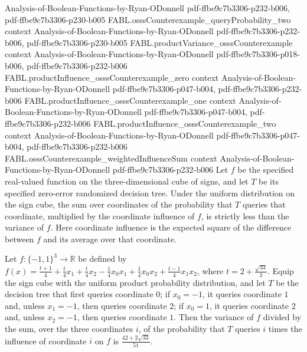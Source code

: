 \begin{theorem}
  {Analysis-of-Boolean-Functions-by-Ryan-ODonnell}
  {pdf-ffbe9c7b3306-p232-b006,
    pdf-ffbe9c7b3306-p230-b005}
\proofstep
  {FABL.osssCounterexample_queryProbability_two}
  {context}
  {Analysis-of-Boolean-Functions-by-Ryan-ODonnell}
  {pdf-ffbe9c7b3306-p232-b006,
    pdf-ffbe9c7b3306-p230-b005}
\proofstep
  {FABL.productVariance_osssCounterexample}
  {context}
  {Analysis-of-Boolean-Functions-by-Ryan-ODonnell}
  {pdf-ffbe9c7b3306-p018-b006,
    pdf-ffbe9c7b3306-p232-b006}
\proofstep
  {FABL.productInfluence_osssCounterexample_zero}
  {context}
  {Analysis-of-Boolean-Functions-by-Ryan-ODonnell}
  {pdf-ffbe9c7b3306-p047-b004,
    pdf-ffbe9c7b3306-p232-b006}
\proofstep
  {FABL.productInfluence_osssCounterexample_one}
  {context}
  {Analysis-of-Boolean-Functions-by-Ryan-ODonnell}
  {pdf-ffbe9c7b3306-p047-b004,
    pdf-ffbe9c7b3306-p232-b006}
\proofstep
  {FABL.productInfluence_osssCounterexample_two}
  {context}
  {Analysis-of-Boolean-Functions-by-Ryan-ODonnell}
  {pdf-ffbe9c7b3306-p047-b004,
    pdf-ffbe9c7b3306-p232-b006}
\proofstep
  {FABL.osssCounterexample_weightedInfluenceSum}
  {context}
  {Analysis-of-Boolean-Functions-by-Ryan-ODonnell}
  {pdf-ffbe9c7b3306-p232-b006}
Let $f$ be the specified real-valued function on the three-dimensional cube of signs,
and let $T$ be its specified zero-error randomized decision tree. Under the uniform
distribution on the sign cube, the sum over coordinates of the probability that $T$
queries that coordinate, multiplied by the coordinate influence of $f$, is strictly less
than the variance of $f$. Here coordinate influence is the expected square of the
difference between $f$ and its average over that coordinate.
\end{theorem}

\begin{theorem}
\label{FABL.osssCounterexample_exact_ratio}
\leanok
{}
Let $f:\{-1,1\}^3\to\mathbb R$ be defined by
$f(x)=\frac{t+1}{4}+\frac{t}{4}x_1+\frac{t}{4}x_2-\frac14x_0x_1+\frac14x_0x_2+\frac{t-1}{4}x_1x_2$,
where $t=2+\frac{\sqrt{33}}{3}$. Equip the sign cube with the uniform product
probability distribution, and let $T$ be the decision tree that first queries coordinate
$0$; if $x_0=-1$, it queries coordinate $1$ and, unless $x_1=-1$, then queries
coordinate $2$; if $x_0=1$, it queries coordinate $2$ and, unless $x_2=-1$, then queries
coordinate $1$. Then the variance of $f$ divided by the sum, over the three coordinates
$i$, of the probability that $T$ queries $i$ times the influence of coordinate $i$ on
$f$ is $\frac{42+2\sqrt{33}}{51}$.
\end{theorem}

